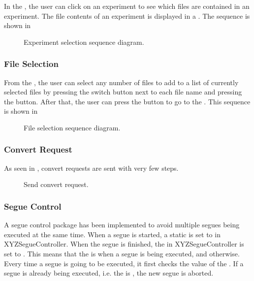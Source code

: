 In the , the user can click on an experiment to see which files are contained in an experiment. The file contents of an experiment is displayed in a . The sequence is shown in  

\begin{figure}[ht]
\caption{Experiment selection sequence diagram.}
\label{fig:ios_sequence_experiment_selection}
\end{figure}

\subsubsection{File Selection}

From the , the user can select any number of files to add to a list of currently selected files by pressing the switch button next to each file name and pressing the  button. After that, the user can press the  button to go to the . This sequence is shown in 

\begin{figure}[ht]
\caption{File selection sequence diagram.}
\label{fig:ios_sequence_file_selection}
\end{figure}

\subsubsection{Convert Request}

As seen in , convert requests are sent with very few steps. 

\begin{figure}[ht]
\caption{Send convert request.}
\label{fig:ios_sequence_convert_request2}
\end{figure}
\FloatBarrier

\subsubsection{Segue Control}
A segue control package has been implemented to avoid multiple segues being executed at the same time. When a segue is started, a static  is set to  in XYZSegueController. When the segue is finished, the  in XYZSegueController is set to . This means that the  is  when a segue is being executed, and  otherwise. Every time a segue is going to be executed, it first checks the value of the . If a segue is already being executed, i.e. the  is , the new segue is aborted.

